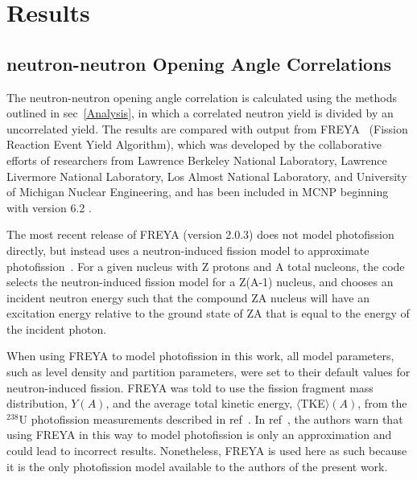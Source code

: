 \chapter{Results}
\thispagestyle{fancy}
\section{neutron-neutron Opening Angle Correlations}
The neutron-neutron opening angle correlation is calculated using the methods outlined in sec~\ref{Analysis}, in which a correlated neutron yield is divided by an uncorrelated yield.
The results are compared with output from FREYA~\cite{FREYA} (Fission Reaction Event Yield Algorithm), which was developed by the collaborative efforts of researchers from Lawrence Berkeley National Laboratory,  Lawrence Livermore National Laboratory, Los Almost National Laboratory, and University of Michigan Nuclear Engineering, and has been included in MCNP beginning with version 6.2 .
 
The most recent release of FREYA (version 2.0.3) does not model photofission directly, but instead uses a neutron-induced fission model to approximate photofission~\cite{FREYA_photofission}.
For a given nucleus with Z protons and A total nucleons, the code selects the neutron-induced fission model for a Z(A-1) nucleus, and chooses an incident neutron energy such that the compound ZA nucleus will have an excitation energy relative to the ground state of ZA that is equal to the energy of the incident photon.

When using FREYA to model photofission in this work, all model parameters, such as level density and partition parameters, were set to their default values for neutron-induced fission.
FREYA was told to use the fission fragment mass distribution, $Y(A)$, and the average total kinetic energy, $\langle$TKE$\rangle(A)$, from the $^{238}$U photofission measurements described in ref~\cite{2017Krishichayan}.
In ref~\cite{Talou2018}, the authors warn that using FREYA in this way to model photofission is only an approximation and could lead to incorrect results.
Nonetheless, FREYA is used here as such because it is the only photofission model available to the authors of the present work.

